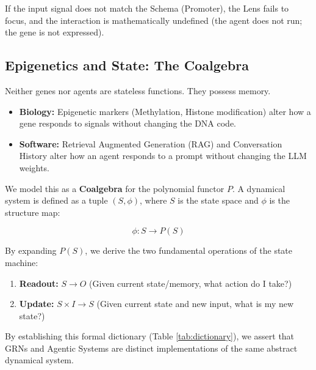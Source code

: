 \documentclass[11pt, a4paper]{article}
\begin{document}
If the input signal does not match the Schema (Promoter), the Lens fails to focus, and the interaction is mathematically undefined (the agent does not run; the gene is not expressed).

\subsection{Epigenetics and State: The Coalgebra}

Neither genes nor agents are stateless functions. They possess memory.
\begin{itemize}
    \item \textbf{Biology:} Epigenetic markers (Methylation, Histone modification) alter how a gene responds to signals without changing the DNA code.
    \item \textbf{Software:} Retrieval Augmented Generation (RAG) and Conversation History alter how an agent responds to a prompt without changing the LLM weights.
\end{itemize}

We model this as a \textbf{Coalgebra} for the polynomial functor $P$. A dynamical system is defined as a tuple $(S, \phi)$, where $S$ is the state space and $\phi$ is the structure map:

\begin{equation}
    \phi: S \to P(S)
\end{equation}

By expanding $P(S)$, we derive the two fundamental operations of the state machine:
\begin{enumerate}
    \item \textbf{Readout:} $S \to O$ (Given current state/memory, what action do I take?)
    \item \textbf{Update:} $S \times I \to S$ (Given current state and new input, what is my new state?)
\end{enumerate}

By establishing this formal dictionary (Table \ref{tab:dictionary}), we assert that GRNs and Agentic Systems are distinct implementations of the same abstract dynamical system.
\end{document}
